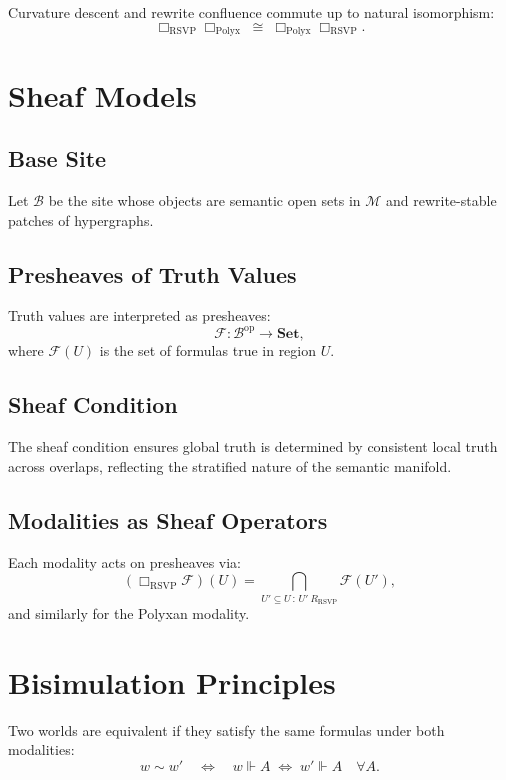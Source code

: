 Curvature descent and rewrite confluence commute up to natural isomorphism:
\[
\Box_{\mathrm{RSVP}}\Box_{\mathrm{Polyx}}
\;\cong\;
\Box_{\mathrm{Polyx}}\Box_{\mathrm{RSVP}}.
\]

\section{Sheaf Models}

\subsection{Base Site}

Let $\mathcal{B}$ be the site whose objects are semantic open sets in $\mathcal{M}$ and rewrite-stable patches of hypergraphs.

\subsection{Presheaves of Truth Values}

Truth values are interpreted as presheaves:
\[
\mathcal{F} : \mathcal{B}^{\mathrm{op}} \to \mathbf{Set},
\]
where $\mathcal{F}(U)$ is the set of formulas true in region $U$.

\subsection{Sheaf Condition}

The sheaf condition ensures global truth is determined by consistent local truth across overlaps, reflecting the stratified nature of the semantic manifold.

\subsection{Modalities as Sheaf Operators}

Each modality acts on presheaves via:
\[
(\Box_{\mathrm{RSVP}}\mathcal{F})(U)
  = \bigcap_{U' \subseteq U\,:\,U'\ R_{\mathrm{RSVP}}} \mathcal{F}(U'),
\]
and similarly for the Polyxan modality.

\section{Bisimulation Principles}

Two worlds are equivalent if they satisfy the same formulas under both modalities:
\[
w \sim w'
\quad\Longleftrightarrow\quad
w \Vdash A \;\Leftrightarrow\; w' \Vdash A
\quad\forall A.
\]

